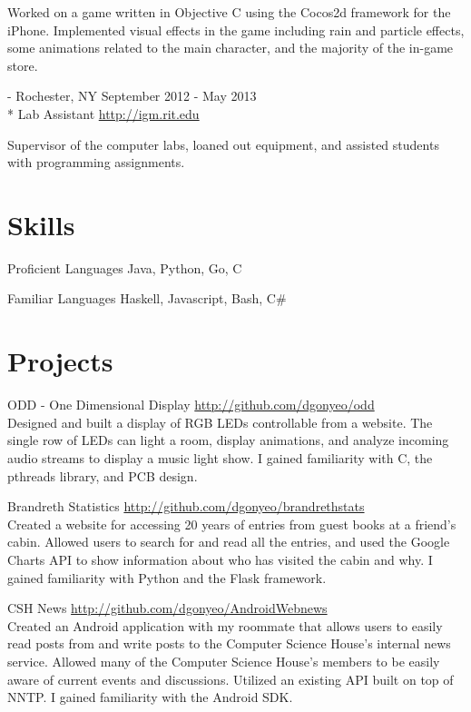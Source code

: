 \documentclass[letterpaper,margin,line,11pt]{resume}
\newcommand{\rurl}[1]{\hfill {\footnotesize \url{#1}}}
\newcommand{\rdate}[1]{\hfill {\small #1}}
\renewcommand{\employer}[5]{\item[#1] - #2 \rdate{#3} \\* #4 \rurl{#5}}
\begin{document}
\begin{resume}
\begin{asparadesc}
        \small
        Worked on a game written in Objective C using the Cocos2d framework for the iPhone. Implemented visual effects in the game including rain and particle effects, some animations related to the main character, and the majority of the in-game store.
        \normalsize
        \\
        \employer{Interactive Games and Media at RIT}{Rochester, NY}{September 2012 - May 2013}{Lab Assistant}{http://igm.rit.edu}

        \small
        Supervisor of the computer labs, loaned out equipment, and assisted students with programming assignments.
    \end{asparadesc}

\section{\mysidestyle Skills}
    \begin{compactdesc}
        \item[Proficient Languages] Java, Python, Go, C
        \item[Familiar Languages] Haskell, Javascript, Bash, C#
    \end{compactdesc}

\section{\mysidestyle Projects}
    \begin{compactdesc}
        \item[ODD - One Dimensional Display] \rurl{http://github.com/dgonyeo/odd} \\
            Designed and built a display of RGB LEDs controllable from a website. The single row of LEDs can light a room, display animations, and analyze incoming audio streams to display a music light show. I gained familiarity with C, the pthreads library, and PCB design.
        \item[Brandreth Statistics] \rurl{http://github.com/dgonyeo/brandrethstats} \\
            Created a website for accessing 20 years of entries from guest books at a friend's cabin. Allowed users to search for and read all the entries, and used the Google Charts API to show information about who has visited the cabin and why. I gained familiarity with Python and the Flask framework.
        \item[CSH News] \rurl{http://github.com/dgonyeo/AndroidWebnews} \\
            Created an Android application with my roommate that allows users to easily read posts from and write posts to the Computer Science House's internal news service. Allowed many of the Computer Science House's members to be easily aware of current events and discussions. Utilized an existing API built on top of NNTP. I gained familiarity with the Android SDK.
    \end{compactdesc}


\end{resume}
\end{document}
